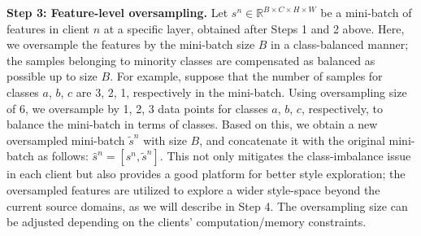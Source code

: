 \documentclass{article}
\theoremstyle{plain}
\theoremstyle{definition}
\theoremstyle{remark}
\begin{document}
\textbf{Step 3: Feature-level oversampling.}
 Let $s^n\in \mathbb{R}^{B \times C \times H \times W}$ be a mini-batch of features in client $n$ at a specific layer,  obtained after   Steps 1 and 2 above.     Here, we oversample the features  by the mini-batch size $B$ in a class-balanced manner;  the samples belonging to minority classes are compensated  as balanced as possible up to size $B$.  For example, suppose  that the number of samples for classes 
$a$, $b$, $c$ are 3, 2, 1, respectively in the mini-batch. Using oversampling size of $6$, we oversample by 1, 2, 3 data points for classes $a$, $b$, $c$, respectively, to balance the mini-batch in terms of classes.   %
Based on this, we obtain a new oversampled mini-batch $\tilde{s}^n$ with size $B$, and concatenate it with the original mini-batch as follows: $\hat{s}^n =  [s^n, \tilde{s}^n ]$.   This   not only mitigates the class-imbalance issue in each client but also provides a good platform for better style exploration; the  oversampled features are utilized to explore a wider style-space  beyond the current source domains, as we will  describe  in Step 4.  The  oversampling size can be adjusted depending on the clients' computation/memory constraints. %

\end{document}
